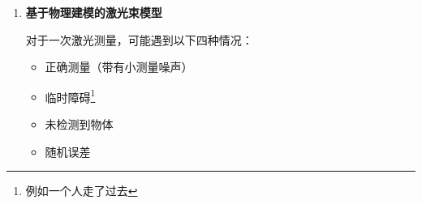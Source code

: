 \documentclass[../main.tex]{subfiles}
\begin{document}
\begin{enumerate}
\begin{enumerate}
            \item \textbf{观测独立}：假设每一个特征的观测条件独立，
            \[
                p(\mathbf{z}_t\mid \mathbf{x}_t,\mathbf{m})
                =p\!\big(\mathbf{f}_t^{1},\mathbf{f}_t^{2},\ldots,\mathbf{f}_t^{K}\mid \mathbf{x}_t,\mathbf{m}\big)
                =\prod_{k=1}^{K}p\!\big(\mathbf{f}_t^{k}\mid \mathbf{x}_t,\mathbf{m}\big).
            \]
        
            \item \textbf{特征的观测模型}\,$p(\mathbf{f}_t^{i}\mid \mathbf{x}_t,\mathbf{m})$：
            \begin{itemize}
                \item 假设$\mathbf{f}_t^{i}$对应的地图特征为$\mathbf{m}_j$，将地图特征$\mathbf{m}_j$转换到机器人坐标系下即为观测特征真值：
                \[
                \hat{\mathbf{f}}_t^{\,i}=
                \begin{pmatrix}
                    \sqrt{(m_{jx}-x)^2+(m_{jy}-y)^2}\\[2pt]
                    \operatorname{arctan2}(m_{jy}-y,\,m_{jx}-x)-\theta\\[2pt]
                    s_{j}
                \end{pmatrix},
                \qquad 
                \mathbf{x}_t=(x,\,y,\,\theta)^{\mathsf T}.
                \]
                \item 测量值$=$真实值$+$误差：$\mathbf{f}_t^{\,i}=\hat{\mathbf{f}}_t^{\,i}+\tilde{\boldsymbol\delta}_f$，且$\,\tilde{\delta}\sim\mathcal{N}(\delta;0,\sigma^{2})$\footnote{我们仍建模误差就是一个零均值、方差$\sigma^{2}$的高斯分布。}；
                \item 根据观测误差模型，则
                \footnote{$\hat{\mathbf{f}}_t^{\,i}$是个常量，误差是个高斯分布的变量，两者加起来还是高斯分布}
                \[
                    p\!\big(\mathbf{f}_t^{i}\mid \mathbf{x}_t,\mathbf{m}\big)=\mathcal{N}\!\big(\mathbf{f}_t^{i};\,\hat{\mathbf{f}}_t^{\,i},\,\sigma_f^{2}\big).
                \]
            \end{itemize}
        \end{enumerate}
        
        \item \textbf{基于物理建模的激光束模型}

对于一次激光测量，可能遇到以下四种情况：
\begin{itemize}
    \item 正确测量（带有小测量噪声）
    \item 临时障碍\footnote{例如一个人走了过去}
    \item 未检测到物体
    \item 随机误差
\end{itemize}


\end{enumerate}
\end{document}

